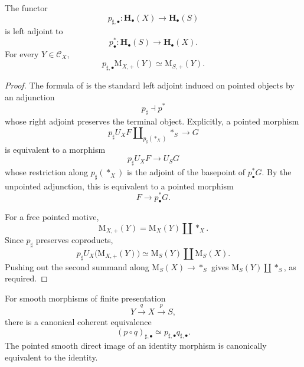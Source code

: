 \begin{proposition}
\label{prop:pointed-smooth-adjunction}
The functor
\[
    p_{\sharp,\bullet}
    \colon
    \mathbf H_\bullet(X)
    \longrightarrow
    \mathbf H_\bullet(S)
\]
is left adjoint to
\[
    p^*_\bullet
    \colon
    \mathbf H_\bullet(S)
    \longrightarrow
    \mathbf H_\bullet(X).
\]
For every \(Y\in\mathcal C_X\),
\[
    p_{\sharp,\bullet}\mathrm M_{X,+}(Y)
    \simeq
    \mathrm M_{S,+}(Y).
\]
\end{proposition}

\begin{proof}
The formula of
is the standard left adjoint induced on pointed objects by an adjunction
\[
    p_\sharp
    \dashv
    p^*
\]
whose right adjoint preserves the terminal object.  Explicitly, a
pointed morphism
\[
    p_\sharp U_XF
    \amalg_{p_\sharp(*_X)}
    *_S
    \longrightarrow
    G
\]
is equivalent to a morphism
\[
    p_\sharp U_XF
    \longrightarrow
    U_SG
\]
whose restriction along \(p_\sharp(*_X)\) is the adjoint of the
basepoint of \(p^*_\bullet G\).  By the unpointed adjunction, this is
equivalent to a pointed morphism
\[
    F
    \longrightarrow
    p^*_\bullet G.
\]

For a free pointed motive,
\[
    \mathrm M_{X,+}(Y)
    =
    \mathrm M_X(Y)\amalg *_X.
\]
Since \(p_\sharp\) preserves coproducts,
\[
    p_\sharp U_X
    \bigl(
        \mathrm M_{X,+}(Y)
    \bigr)
    \simeq
    \mathrm M_S(Y)
    \amalg
    \mathrm M_S(X).
\]
Pushing out the second summand along
\(\mathrm M_S(X)\to *_S\) gives
\(\mathrm M_S(Y)\amalg *_S\), as required.
\end{proof}

\begin{proposition}
\label{prop:pointed-smooth-direct-image-composition}
For smooth morphisms of finite presentation
\[
    Y
    \xrightarrow{q}
    X
    \xrightarrow{p}
    S,
\]
there is a canonical coherent equivalence
\[
    (p\circ q)_{\sharp,\bullet}
    \simeq
    p_{\sharp,\bullet}q_{\sharp,\bullet}.
\]
The pointed smooth direct image of an identity morphism is canonically
equivalent to the identity.
\end{proposition}

